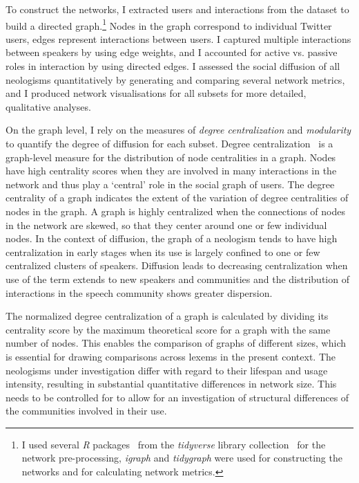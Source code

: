 \documentclass[
  a4paper,
  abstract=on,
  captions=tableabove,
  ]{scrartcl}
\begin{document}
  To construct the networks, I extracted users and interactions from the dataset to build a directed graph.\footnote{I used several \emph{R} packages~\parencite{RCoreTeam2018LanguageEnvironment} from the \emph{tidyverse} library collection~\parencite{Wickham2019WelcomeTidyverse} for the network pre-processing, \emph{igraph} and \emph{tidygraph} were used for constructing the networks and for calculating network metrics.} Nodes in the graph correspond to individual Twitter users, edges represent interactions between users. I captured multiple interactions between speakers by using edge weights, and I accounted for active vs. passive roles in interaction by using directed edges. I assessed the social diffusion of all neologisms quantitatively by generating and comparing several network metrics, and I produced network visualisations for all subsets for more detailed, qualitative analyses.

  On the graph level, I rely on the measures of \emph{degree centralization} and \emph{modularity} to quantify the degree of diffusion for each subset. Degree centralization~\parencite{Freeman1978CentralitySocial} is a graph-level measure for the distribution of node centralities in a graph. Nodes have high centrality scores when they are involved in many interactions in the network and thus play a `central' role in the social graph of users. The degree centrality of a graph indicates the extent of the variation of degree centralities of nodes in the graph. A graph is highly centralized when the connections of nodes in the network are skewed, so that they center around one or few individual nodes. In the context of diffusion, the graph of a neologism tends to have high centralization in early stages when its use is largely confined to one or few centralized clusters of speakers. Diffusion leads to decreasing centralization when use of the term extends to new speakers and communities and the distribution of interactions in the speech community shows greater dispersion.

  The normalized degree centralization of a graph is calculated by dividing its centrality score by the maximum theoretical score for a graph with the same number of nodes. This enables the comparison of graphs of different sizes, which is essential for drawing comparisons across lexems in the present context. The neologisms under investigation differ with regard to their lifespan and usage intensity, resulting in substantial quantitative differences in network size. This needs to be controlled for to allow for an investigation of structural differences of the communities involved in their use.
\end{document}
